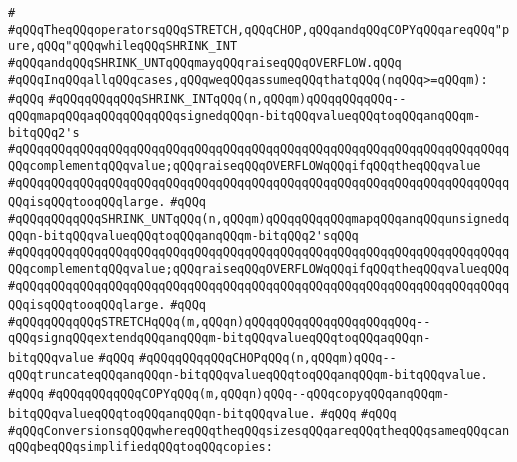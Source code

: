 \verb|#|\newline
\verb|#qQQqTheqQQqoperatorsqQQqSTRETCH,qQQqCHOP,qQQqandqQQqCOPYqQQqareqQQq"pure,qQQq"qQQqwhileqQQqSHRINK_INT|\newline
\verb|#qQQqandqQQqSHRINK_UNTqQQqmayqQQqraiseqQQqOVERFLOW.qQQq|\newline
\newline
\verb|#qQQqInqQQqallqQQqcases,qQQqweqQQqassumeqQQqthatqQQq(nqQQq>=qQQqm):|\newline
\verb|#qQQq|\newline
\verb|#qQQqqQQqqQQqSHRINK_INTqQQq(n,qQQqm)qQQqqQQqqQQq--qQQqmapqQQqaqQQqqQQqqQQqsignedqQQqn-bitqQQqvalueqQQqtoqQQqanqQQqm-bitqQQq2's|\newline
\verb|#qQQqqQQqqQQqqQQqqQQqqQQqqQQqqQQqqQQqqQQqqQQqqQQqqQQqqQQqqQQqqQQqqQQqqQQqcomplementqQQqvalue;qQQqraiseqQQqOVERFLOWqQQqifqQQqtheqQQqvalue|\newline
\verb|#qQQqqQQqqQQqqQQqqQQqqQQqqQQqqQQqqQQqqQQqqQQqqQQqqQQqqQQqqQQqqQQqqQQqqQQqisqQQqtooqQQqlarge.|\newline
\verb|#qQQq|\newline
\verb|#qQQqqQQqqQQqSHRINK_UNTqQQq(n,qQQqm)qQQqqQQqqQQqmapqQQqanqQQqunsignedqQQqn-bitqQQqvalueqQQqtoqQQqanqQQqm-bitqQQq2'sqQQq|\newline
\verb|#qQQqqQQqqQQqqQQqqQQqqQQqqQQqqQQqqQQqqQQqqQQqqQQqqQQqqQQqqQQqqQQqqQQqqQQqcomplementqQQqvalue;qQQqraiseqQQqOVERFLOWqQQqifqQQqtheqQQqvalueqQQq|\newline
\verb|#qQQqqQQqqQQqqQQqqQQqqQQqqQQqqQQqqQQqqQQqqQQqqQQqqQQqqQQqqQQqqQQqqQQqqQQqisqQQqtooqQQqlarge.|\newline
\verb|#qQQq|\newline
\verb|#qQQqqQQqqQQqSTRETCHqQQq(m,qQQqn)qQQqqQQqqQQqqQQqqQQqqQQq--qQQqsignqQQqextendqQQqanqQQqm-bitqQQqvalueqQQqtoqQQqaqQQqn-bitqQQqvalue|\newline
\verb|#qQQq|\newline
\verb|#qQQqqQQqqQQqCHOPqQQq(n,qQQqm)qQQq--qQQqtruncateqQQqanqQQqn-bitqQQqvalueqQQqtoqQQqanqQQqm-bitqQQqvalue.|\newline
\verb|#qQQq|\newline
\verb|#qQQqqQQqqQQqCOPYqQQq(m,qQQqn)qQQq--qQQqcopyqQQqanqQQqm-bitqQQqvalueqQQqtoqQQqanqQQqn-bitqQQqvalue.|\newline
\verb|#qQQq|\newline
\verb|#qQQq|\newline
\verb|#qQQqConversionsqQQqwhereqQQqtheqQQqsizesqQQqareqQQqtheqQQqsameqQQqcanqQQqbeqQQqsimplifiedqQQqtoqQQqcopies:|\newline

